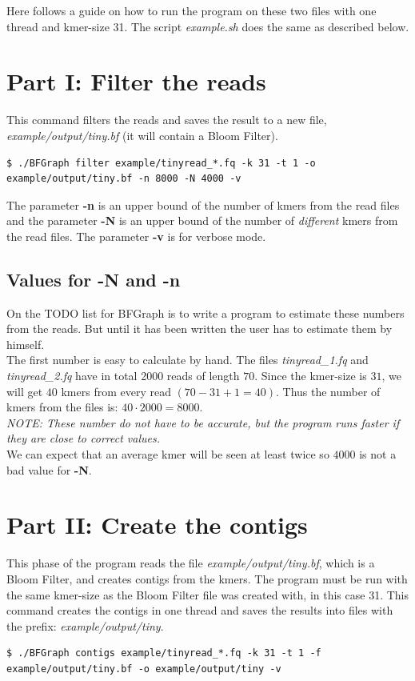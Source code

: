 \documentclass[a4paper]{report}
\renewcommand{\b}[1]{\textbf{#1}}  %
\newcommand{\e}[1]{\emph{#1}}    %
\begin{document}
Here follows a guide on how to run the program on these two files with one thread and kmer-size 31.
The script \e{example.sh} does the same as described below.

\section{Part I: Filter the reads}
This command filters the reads and saves the result to a new file, \e{example/output/tiny.bf} (it will contain a Bloom Filter).
\begin{verbatim}
$ ./BFGraph filter example/tinyread_*.fq -k 31 -t 1 -o example/output/tiny.bf -n 8000 -N 4000 -v
\end{verbatim}

The parameter \b{-n} is an upper bound of the number of kmers from the read files and the parameter \b{-N} is an upper bound
of the number of \textit{different} kmers from the read files. The parameter \b{-v} is for verbose mode.\\[4pt]

\subsection{Values for -N and -n}  %
On the TODO list for BFGraph is to write a program to estimate these numbers from the reads. But until it has been written the user has to estimate
them by himself. \\[4pt]

The first number is easy to calculate by hand. The files \e{tinyread\_1.fq} and \e{tinyread\_2.fq} have in total 2000 reads of length $70$.
Since the kmer-size is $31$, we will get $40$ kmers from every read $(70 - 31 + 1=40)$. Thus the number of kmers from the files
is: $40\cdot 2000=8000$. \\[4pt]

\textit{NOTE: These number do not have to be accurate, but the program runs faster if they are close to correct values.} \\[4pt]

We can expect that an average kmer will be seen at least twice so $4000$ is not a bad value for \b{-N}.

\newpage
\section{Part II: Create the contigs}
This phase of the program reads the file \e{example/output/tiny.bf}, which is a Bloom Filter, and creates contigs from the kmers. 
The program must be run with the same kmer-size as the Bloom Filter file was created with, in this case 31.
This command creates the contigs in one thread and saves the results into files with the prefix: \e{example/output/tiny}.
\footnotesize
\begin{verbatim}
$ ./BFGraph contigs example/tinyread_*.fq -k 31 -t 1 -f example/output/tiny.bf -o example/output/tiny -v
\end{verbatim}
\normalsize
\end{document}
